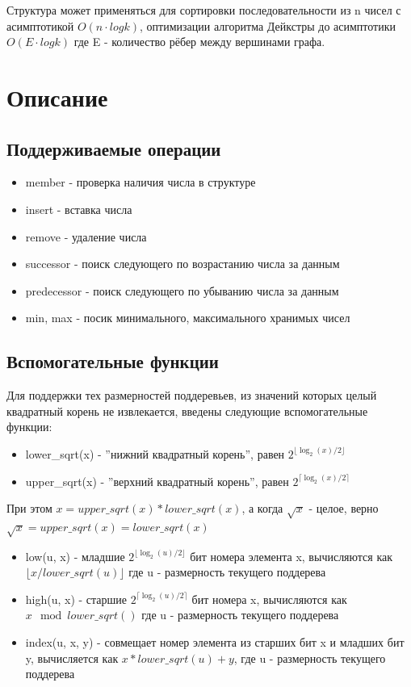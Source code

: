 \documentclass{article}
\begin{document}
Структура может применяться для сортировки последовательности из n чисел с асимптотикой $O(n \cdot log{k})$, оптимизации алгоритма Дейкстры до асимптотики $O(E \cdot log{k})$ где E - количество рёбер между вершинами графа. \cite{ifmo}
\section{Описание}
\subsection{Поддерживаемые операции}
\begin{itemize}
    \item member - проверка наличия числа в структуре
    \item insert - вставка числа
    \item remove - удаление числа
    \item successor - поиск следующего по возрастанию числа за данным
    \item predecessor - поиск следующего по убыванию числа за данным
    \item min, max - посик минимального, максимального хранимых чисел 
\end{itemize}
\subsection{Вспомогательные функции}
Для поддержки тех размерностей поддеревьев, из значений которых целый квадратный корень не извлекается, введены следующие вспомогательные функции:
\begin{itemize}
    \item lower\_sqrt(x) - ''нижний квадратный корень'', равен $2^{\lfloor\log_{2}(x)/2\rfloor}$
    \item upper\_sqrt(x) - ''верхний квадратный корень'', равен $2^{\lceil\log_{2}(x)/2\rceil}$
\end{itemize}
При этом $x = upper\_sqrt(x) * lower\_sqrt(x)$, а когда $\sqrt{x}$ - целое, верно $\sqrt{x} = upper\_sqrt(x) = lower\_sqrt(x)$
\begin{itemize}
    \item low(u, x) - младшие $2^{\lfloor\log_{2}(u)/2\rfloor}$ бит номера элемента x, вычисляются как $\lfloor{x/lower\_sqrt(u)}\rfloor$ где u - размерность текущего поддерева
    \item high(u, x) - старшие $2^{\lceil\log_{2}(u)/2\rceil}$ бит номера x, вычисляются как $x\mod{lower\_sqrt()}$  где u - размерность текущего поддерева
    \item index(u, x, y) - совмещает номер элемента из старших бит x и младших бит y, вычисляется как $x*lower\_sqrt(u) + y$, где u - размерность текущего поддерева
    
\end{itemize}
\cite{ita}
\end{document}
